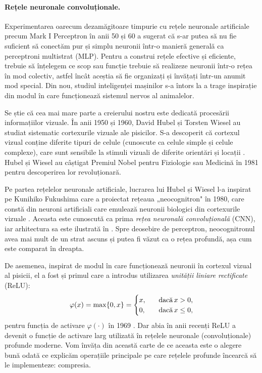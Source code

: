 \documentclass[../../book-main_ro.tex]{subfiles}
\begin{document}
\paragraph{Rețele neuronale convoluționale.}
Experimentarea oarecum dezamăgitoare timpurie cu rețele neuronale artificiale precum Mark I Perceptron în anii 50 și 60 a sugerat că s-ar putea să nu fie suficient să conectăm pur și simplu neuronii într-o manieră generală ca perceptroni multistrat (MLP). Pentru a construi rețele efective și eficiente, trebuie să înțelegem ce scop sau funcție trebuie să realizeze neuronii într-o rețea în mod colectiv, astfel încât aceștia să fie organizați și învățați într-un anumit mod special. Din nou, studiul inteligenței mașinilor s-a întors la a trage inspirație din modul în care funcționează sistemul nervos al animalelor.

Se știe că cea mai mare parte a creierului nostru este dedicată procesării informațiilor vizuale. În anii 1950 și 1960, David Hubel și Torsten Wiesel au studiat sistematic cortexurile vizuale ale pisicilor. S-a descoperit că cortexul vizual conține diferite tipuri de celule (cunoscute ca celule simple și celule complexe), care sunt sensibile la stimuli vizuali de diferite orientări și locații \cite{Hubel-Wiesel-1959}. Hubel și Wiesel au câștigat Premiul Nobel pentru Fiziologie sau Medicină în 1981 pentru descoperirea lor revoluționară.


Pe partea rețelelor neuronale artificiale, lucrarea lui Hubel și Wiesel l-a inspirat pe Kunihiko Fukushima care a proiectat rețeaua „neocognitron" în 1980, care constă din neuroni artificiali care emulează neuronii biologici din cortexurile vizuale \cite{Fukushima1980NeocognitronAS}. Aceasta este cunoscută ca prima {\em rețea neuronală convoluțională} (CNN), iar arhitectura sa este ilustrată în . Spre deosebire de perceptron, neocognitronul avea mai mult de un strat ascuns și putea fi văzut ca o rețea profundă, așa cum este comparat în  dreapta.

De asemenea, inspirat de modul în care funcționează neuronii în cortexul vizual al pisicii, el a fost și primul care a introdus utilizarea {\em unității liniare rectificate} (ReLU):
\begin{equation}
    \varphi(x) = \max\{0, x\} = \begin{cases}x, & \text{dacă} \, x > 0, \\ 0, \quad & \text{dacă} \, x \leq 0,\end{cases}
\end{equation}
pentru funcția de activare $\varphi(\cdot)$ în 1969 \cite{Fukushima-1969}. Dar abia în anii recenți ReLU a devenit o funcție de activare larg utilizată în rețelele neuronale (convoluționale) profunde moderne. Vom învăța din această carte de ce aceasta este o alegere bună odată ce explicăm operațiile principale pe care rețelele profunde încearcă să le implementeze: compresia.
\end{document}
